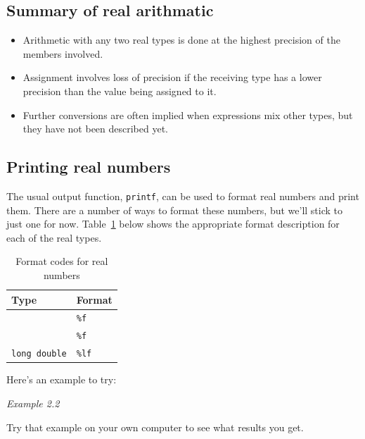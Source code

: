  \subsection{Summary of real arithmatic}

   \begin{itemize}
   \item
     Arithmetic with any two real types is done
     at the highest precision of the members involved.
   \item
     Assignment involves loss of precision if the receiving type has a lower
     precision than the value being assigned to it.
   \item
     Further conversions are often implied when expressions mix other types,
     but they have not been described yet.
   \end{itemize}

  

  \subsection{Printing real numbers}
   

   The usual output function, \texttt{printf}, can be used to format
    real numbers and print them. There are a number of ways to format these
    numbers, but we'll stick to just one for now.
    Table~\ref{tab:formatReal} below
    shows the appropriate format description for each of the real types.


    \begin{table}[htb]
      \centering
      \begin{tabular}{ll}
        \toprule
        Type                 & Format        \\
        \midrule
        \float{}             & \texttt{\%f}  \\
        \double{}            & \texttt{\%f}  \\
        \texttt{long double} & \texttt{\%lf} \\
        \bottomrule
      \end{tabular}
      \caption{\label{tab:formatReal}Format codes for real numbers}
    \end{table}


   Here's an example to try:


   \begin{center}\textit{Example 2.2}\end{center}


   Try that example on your own computer to see what results you get.


